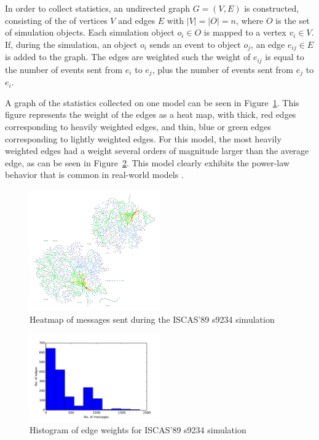\documentclass[11pt]{book}
\begin{document}
In order to collect statistics, an undirected graph \(G=(V,E)\) is constructed, consisting of the of vertices \(V\) and edges \(E\) with \(|V| = |O| = n\), where \(O\) is the set of simulation objects. Each simulation object \(o_i \in O\) is mapped to a vertex \(v_i \in V\). If, during the simulation, an object \(o_i\) sends an event to object \(o_j\), an edge \(e_{ij} \in E\) is added to the graph. The edges are weighted such the weight of \(e_{ij}\) is equal to the number of events sent from \(e_i\) to \(e_j\), plus the number of events sent from \(e_j\) to \(e_i\). 

A graph of the statistics collected on one model can be seen in Figure~\ref{fig:s9234}. This figure represents the weight of the edges as a heat map, with thick, red edges corresponding to heavily weighted edges, and thin, blue or green edges corresponding to lightly weighted edges. For this model, the most heavily weighted edges had a weight several orders of magnitude larger than the average edge, as can be seen in Figure~\ref{fig:s9234_histo}. This model clearly exhibits the power-law behavior that is common in real-world models \cite{clauset-09}.

\begin{figure}[h]\label{fig:s9234}
\centering
\includegraphics[clip=true,width=0.5\textwidth]{figs/s9234}
\caption{Heatmap of messages sent during the ISCAS'89 s9234 simulation}
\end{figure}

\begin{figure}[h]\label{fig:s9234_histo}
\centering
\includegraphics[clip=true,width=0.5\textwidth]{figs/s9234_histo}
\caption{Histogram of edge weights for ISCAS'89 s9234 simulation}
\end{figure}
\end{document}
